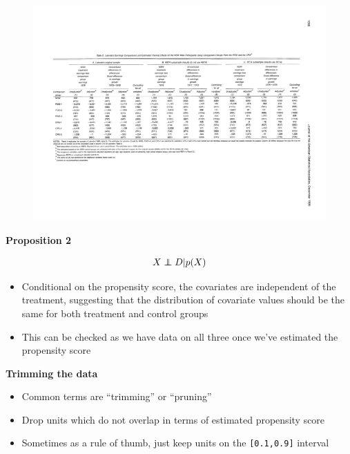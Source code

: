 \documentclass[notes=show]{beamer}
\newcommand\independent{\protect\mathpalette{\protect\independenT}{\perp}}
\def\independenT#1#2{\mathrel{\rlap{$#1#2$}\mkern2mu{#1#2}}}
\begin{document}
\begin{frame}[plain]

\begin{figure}
\includegraphics[scale=0.5]{./lecture_includes/dw_2.pdf}
\end{figure}


\end{frame}

\begin{frame}[plain]

	\begin{center}
	\textbf{Proposition 2}
	\end{center}
	
	\begin{eqnarray*}
	X \independent D | p(X)
	\end{eqnarray*}
	
	\begin{itemize}
	\item Conditional on the propensity score, the covariates are independent of the treatment, suggesting that the distribution of covariate values should be the same for both treatment and control groups
	\item This can be checked as we have data on all three once we've estimated the propensity score
	\end{itemize}

\end{frame}

\begin{frame}[plain]

	\begin{center}
	\textbf{Trimming the data}
	\end{center}
	
	\begin{itemize}
	\item Common terms are ``trimming'' or ``pruning''
	\item Drop units which do not overlap in terms of estimated propensity score
	\item Sometimes as a rule of thumb, just keep units on the \texttt{[0.1,0.9]} interval
	\end{itemize}

\end{frame}
\end{document}
